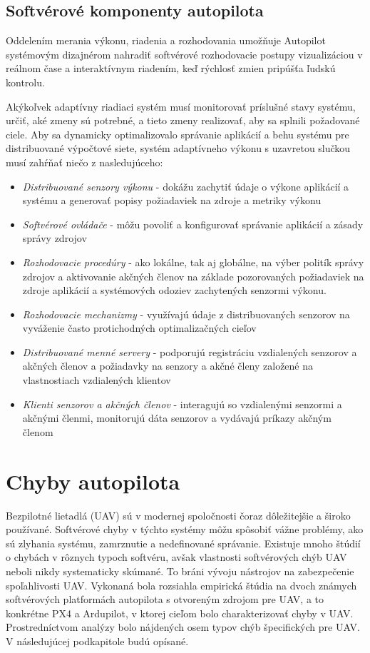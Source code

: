 \documentclass[10pt,twoside,slovak,a4paper]{article}
\begin{document}
\subsection{Softvérové komponenty autopilota}

Oddelením merania výkonu, riadenia a rozhodovania umožňuje Autopilot systémovým dizajnérom nahradiť softvérové rozhodovacie postupy vizualizáciou v reálnom čase a interaktívnym riadením, keď rýchlosť zmien pripúšťa ľudskú kontrolu.

Akýkoľvek adaptívny riadiaci systém musí monitorovať príslušné stavy systému, určiť, aké zmeny sú potrebné, a tieto zmeny realizovať, aby sa splnili požadované ciele. Aby sa dynamicky optimalizovalo správanie aplikácií a behu systému pre distribuované výpočtové siete, systém adaptívneho výkonu s uzavretou slučkou musí zahŕňať
niečo z nasledujúceho:

\begin{itemize}
\item \emph{Distribuované senzory výkonu} - dokážu zachytiť údaje o výkone aplikácií a systému a generovať popisy požiadaviek na zdroje a metriky výkonu
\item \emph{Softvérové ovládače} - môžu povoliť a konfigurovať správanie aplikácií a zásady správy zdrojov
\item \emph{Rozhodovacie procedúry} - ako lokálne, tak aj globálne, na výber politík správy zdrojov a aktivovanie akčných členov na základe pozorovaných požiadaviek na zdroje aplikácií a systémových odoziev zachytených senzormi výkonu.
\item \emph{Rozhodovacie mechanizmy} - využívajú údaje z distribuovaných senzorov na vyváženie často protichodných optimalizačných cieľov
\item \emph{Distribuované menné servery} - podporujú registráciu vzdialených senzorov a akčných členov a požiadavky na senzory a akčné členy založené na vlastnostiach vzdialených klientov
\item \emph{Klienti senzorov a akčných členov} - interagujú so vzdialenými senzormi a akčnými členmi, monitorujú dáta senzorov a vydávajú príkazy akčným členom \cite{SoftverAutopilot}
\end{itemize}

\section{Chyby autopilota} \label{chyby}

Bezpilotné lietadlá (UAV) sú v modernej spoločnosti čoraz dôležitejšie a široko používané. Softvérové chyby v týchto systémy môžu spôsobiť vážne problémy, ako sú zlyhania systému, zamrznutie a nedefinované správanie. Existuje mnoho štúdií o chybách v rôznych typoch softvéru, avšak vlastnosti softvérových chýb UAV neboli nikdy systematicky skúmané. To bráni vývoju nástrojov na zabezpečenie spoľahlivosti UAV. Vykonaná bola rozsiahla empirická štúdia na dvoch známych softvérových platformách autopilota s otvoreným zdrojom pre UAV, a to konkrétne PX4 a Ardupilot, v ktorej cieľom bolo charakterizovať chyby v UAV. Prostredníctvom analýzy bolo nájdených osem typov chýb špecifických pre UAV. V následujúcej podkapitole budú opísané.\cite{chybyautopilot}
\end{document}
